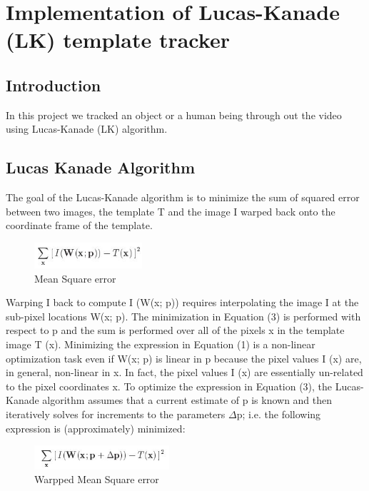 \documentclass[12pt]{article}
\begin{document}
\section{Implementation of Lucas-Kanade (LK) template tracker} 
\subsection{Introduction}
In this project we tracked an object or a human being through out the video using Lucas-Kanade (LK) algorithm.

\subsection{Lucas Kanade Algorithm}
The goal of the Lucas-Kanade algorithm is to minimize the sum of squared error between two
images, the template T and the image I warped back onto the coordinate frame of the template.

\begin{figure}[h]
    \centering
    \includegraphics[width=4cm]{error1}
    \caption{Mean Square error}
    \label{fig:Mean Square error}
\end{figure}
Warping I back to compute I (W(x; p)) requires interpolating the image I at the sub-pixel locations W(x; p). The minimization in Equation (3) is performed with respect to p and the sum is
performed over all of the pixels x in the template image T (x). Minimizing the expression in Equation (1) is a non-linear optimization task even if W(x; p) is linear in p because the pixel values
I (x) are, in general, non-linear in x. In fact, the pixel values I (x) are essentially un-related to
the pixel coordinates x. To optimize the expression in Equation (3), the Lucas-Kanade algorithm
assumes that a current estimate of p is known and then iteratively solves for increments to the
parameters $\Delta$p; i.e. the following expression is (approximately) minimized:

\begin{figure}[h]
    \centering
    \includegraphics[width=5cm]{error2}
    \caption{Warpped Mean Square error}
    \label{fig:Warpped Mean Square error}
\end{figure}
\end{document}
